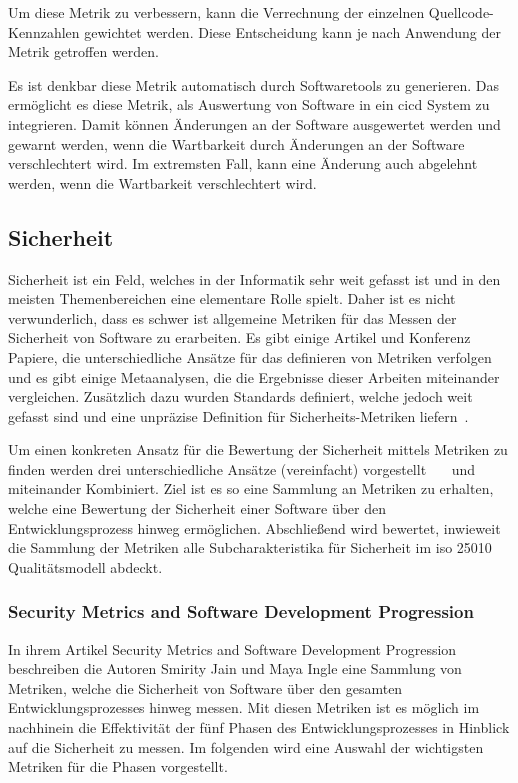 \documentclass[12pt, a4paper, ngerman]{article}
\begin{document}
Um diese Metrik zu verbessern,
kann die Verrechnung der einzelnen Quellcode-Kennzahlen
gewichtet werden.
Diese Entscheidung kann je nach Anwendung der Metrik getroffen werden.

Es ist denkbar diese Metrik automatisch durch
Softwaretools zu generieren.
Das ermöglicht es diese Metrik, als Auswertung von Software
in ein \ac{cicd} System zu integrieren.
Damit können Änderungen an der Software ausgewertet werden
und gewarnt werden, wenn die Wartbarkeit durch Änderungen an der Software verschlechtert wird.
Im extremsten Fall, kann eine Änderung auch abgelehnt werden, wenn die Wartbarkeit verschlechtert wird.

\subsection{Sicherheit}

Sicherheit ist ein Feld, welches in der Informatik sehr weit gefasst ist und in den meisten Themenbereichen eine elementare Rolle spielt.
Daher ist es nicht verwunderlich, dass es schwer ist allgemeine Metriken für das Messen der Sicherheit von Software zu erarbeiten.
Es gibt einige Artikel und Konferenz Papiere, die unterschiedliche Ansätze für das definieren von Metriken verfolgen und es gibt einige 
Metaanalysen, die die Ergebnisse dieser Arbeiten miteinander vergleichen. 
Zusätzlich dazu wurden Standards definiert, welche jedoch weit gefasst sind und eine unpräzise Definition für Sicherheits-Metriken liefern~\cite{MeFlado_Fernández-Medina_Piattini_2010}.

Um einen konkreten Ansatz für die Bewertung der Sicherheit mittels Metriken zu finden werden 
drei unterschiedliche Ansätze (vereinfacht) vorgestellt~\cite{Jain2014SecurityMA}~\cite{Chowdhury_Chan_Zulkernine_2008}~\cite{Wang_Wang_Guo_Xia_2009} und miteinander Kombiniert.
Ziel ist es so eine Sammlung an Metriken zu erhalten, 
welche eine Bewertung der Sicherheit einer Software über den Entwicklungsprozess hinweg ermöglichen. 
Abschließend wird bewertet, inwieweit die Sammlung der Metriken alle Subcharakteristika für Sicherheit im \ac{iso} 25010 Qualitätsmodell abdeckt.

\subsubsection{Security Metrics and Software Development Progression~\cite{Jain2014SecurityMA}}

In ihrem Artikel Security Metrics and Software Development Progression beschreiben die Autoren Smirity Jain und Maya Ingle eine Sammlung von Metriken, 
welche die Sicherheit von Software über den gesamten Entwicklungsprozesses hinweg messen.
Mit diesen Metriken ist es möglich im nachhinein die Effektivität der fünf Phasen des Entwicklungsprozesses in Hinblick auf die Sicherheit zu messen.
Im folgenden wird eine Auswahl der wichtigsten Metriken für die Phasen vorgestellt.
\end{document}
